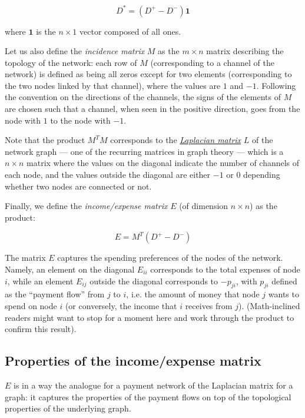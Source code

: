 \documentclass[a4paper]{article}
\begin{document}
\begin{equation}
D^* = (D^+ - D^-) \mathbf{1}
\end{equation}

where $\mathbf{1}$ is the $n \times 1$ vector composed of all ones.

Let us also define the \emph{incidence matrix} $M$ as the $m \times n$ matrix describing the topology of the network: each row of $M$ (corresponding to a channel of the network) is defined as being all zeros except for two elements (corresponding to the two nodes linked by that channel), where the values are $1$ and $-1$. Following the convention on the directions of the channels, the signs of the elements of $M$ are chosen such that a channel, when seen in the positive direction, goes from the node with $1$ to the node with $-1$.

Note that the product $M^T M$ corresponds to the \href{https://en.wikipedia.org/wiki/Laplacian_matrix}{\emph{Laplacian matrix}} $L$ of the network graph --- one of the recurring matrices in graph theory --- which is a $n \times n$ matrix where the values on the diagonal indicate the number of channels of each node, and the values outside the diagonal are either $-1$ or $0$ depending whether two nodes are connected or not.

Finally, we define the \emph{income/expense matrix} $E$ (of dimension $n \times n$) as the product:

\begin{equation}
E = M^T (D^+ - D^-)
\end{equation}

The matrix $E$ captures the spending preferences of the nodes of the network. Namely, an element on the diagonal $E_{ii}$ corresponds to the total expenses of node $i$, while an element $E_{ij}$ outside the diagonal corresponds to $-p_{ji}$, with $p_{ji}$ defined as the ``payment flow'' from $j$ to $i$, i.e. the amount of money that node $j$ wants to spend on node $i$ (or conversely, the income that $i$ receives from $j$). (Math-inclined readers might want to stop for a moment here and work through the product to confirm this result).

\subsection{Properties of the income/expense matrix}

$E$ is in a way the analogue for a payment network of the Laplacian matrix for a graph: it captures the properties of the payment flows on top of the topological properties of the underlying graph.
\end{document}
